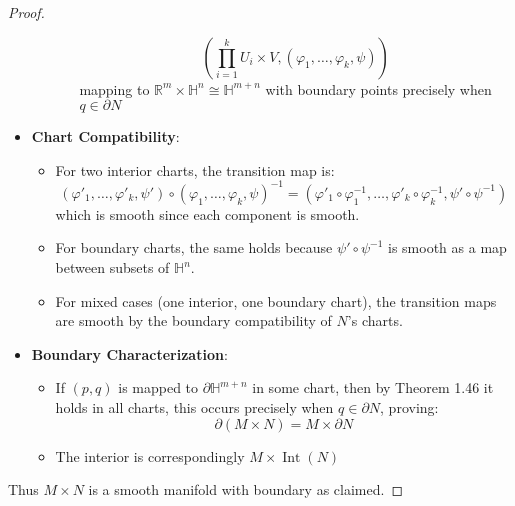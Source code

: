 \begin{problem}
\begin{proof}
\begin{itemize}
\begin{itemize}
\begin{enumerate}
              $$
              \left( \prod_{i=1}^k U_i \times V, (\varphi_1,\ldots,\varphi_k,\psi) \right)
              $$
              mapping to $\mathbb{R}^m \times \mathbb{H}^n \cong \mathbb{H}^{m+n}$ with boundary points precisely when $q \in \partial N$
          \end{enumerate}
        \end{itemize}
      \item \textbf{Chart Compatibility}:
        \begin{itemize}
          \item For two interior charts, the transition map is:
            $$
            (\varphi'_1,\ldots,\varphi'_k,\psi') \circ (\varphi_1,\ldots,\varphi_k,\psi)^{-1} = (\varphi'_1\circ\varphi_1^{-1},\ldots,\varphi'_k\circ\varphi_k^{-1}, \psi'\circ\psi^{-1})
            $$
            which is smooth since each component is smooth.
          \item For boundary charts, the same holds because $\psi'\circ\psi^{-1}$ is smooth as a map between subsets of $\mathbb{H}^n$.
          \item For mixed cases (one interior, one boundary chart), the transition maps are smooth by the boundary compatibility of $N$'s charts.
      \end{itemize}
      \item \textbf{Boundary Characterization}:
        \begin{itemize}
          \item If $(p,q)$ is mapped to $\partial\mathbb{H}^{m+n}$ in some chart, then by Theorem 1.46 it holds in all charts, this occurs precisely when $q \in \partial N$, proving:
            $$
            \partial(M \times N) = M \times \partial N
            $$
          \item The interior is correspondingly $M \times \operatorname{Int}(N)$
        \end{itemize}
  \end{itemize}
  Thus $M \times N$ is a smooth manifold with boundary as claimed. \qedhere
  \end{proof}
\end{problem}